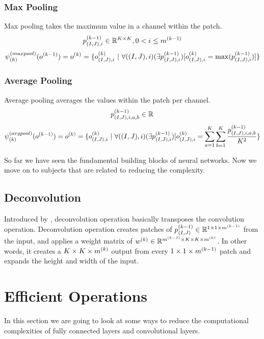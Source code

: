 \subsubsection{Max Pooling}
Max pooling takes the maximum value in a channel within the patch.
$$ p^{(k-1)}_{(I,J),i} \in \mathbb{R}^{K \times K}, 0 < i \leq m^{(k-1)} $$
$$ \psi^{(maxpool)}_{(k)}(o^{(k-1)}) = o^{(k)} = \{ o^{(k)}_{(I,J),i} \ | \ \forall ((I,J),i) (\exists p^{(k-1)}_{(I,J),i}) [o^{(k)}_{(I,J),i} = \max(p^{(k-1)}_{(I,J),i})]  \}  $$

\subsubsection{Average Pooling}
Average pooling averages the values within the patch per channel. 
$$ p^{(k-1)}_{(I,J),i,a,b} \in \mathbb{R}^{} $$
$$ \psi^{(avgpool)}_{(k)}(o^{(k-1)}) = o^{(k)} = \{o^{(k)}_{(I,J),i}  \ | \ \forall ((I,J),i) (\exists p^{(k-1)}_{(I,J),i}) [o^{(k)}_{(I,J),i} = \sum_{a=1}^{K}\sum_{b=1}^{K}\frac{p^{(k-1)}_{(I,J),i,a,b}}{K^2} \} $$

So far we have seen the fundamental building blocks of neural networks. Now we move on to subjects that are related to reducing the complexity. 


\subsection{Deconvolution}
Introduced by \cite{zeiler2010deconvolutional}, deconvolution operation basically transposes the convolution operation. Deconvolution operation creates patches of $p^{(k-1)}_{(I,J)} \in \mathbb{R}^{1 \times 1 \times m^{(k-1)}}$ from the input, and applies a weight matrix of $w^{(k)} \in \mathbb{R}^{m^{(k-1)} \times K \times K \times m^{(k)}}$. In other words, it creates a $K \times K \times m^{(k)}$ output from every $1 \times 1 \times m^{(k-1)}$ patch and expands the height and width of the input. 


\section{Efficient Operations}
In this section we are going to look at some ways to reduce the computational complexities of fully connected layers and convolutional layers. 

